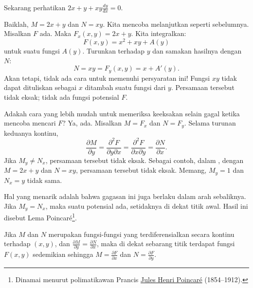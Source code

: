 \begin{example} \label{exact:example:2xyandxy}
Sekarang perhatikan $2x+y + xy \frac{dy}{dx} = 0$.

Baiklah\@, $M = 2x+y$ dan $N=xy$.  Kita mencoba melanjutkan seperti sebelumnya.
Misalkan
$F$ ada.  Maka $F_x (x,y) = 2x+y$.
Kita integralkan:
\begin{equation*}
F(x,y) = x^2 + xy + A(y)
\end{equation*}
untuk suatu fungsi $A(y)$.  Turunkan terhadap $y$ dan samakan hasilnya dengan $N$:
\begin{equation*}
N = xy = F_y (x,y) = x+A'(y) .
\end{equation*}
Akan tetapi, tidak ada cara untuk memenuhi persyaratan ini!  Fungsi $xy$ tidak dapat
dituliskan sebagai $x$ ditambah suatu fungsi dari $y$.  Persamaan tersebut tidak
eksak; tidak ada fungsi potensial $F$.
\end{example}

Adakah cara yang lebih mudah untuk memeriksa keeksakan selain gagal
ketika mencoba mencari $F$?
Ya, ada.  Misalkan
$M = F_x$ dan
$N = F_y$.
Selama turunan keduanya kontinu,
\begin{equation*}
\frac{\partial M}{\partial y}
=
\frac{\partial^2 F}{\partial y \partial x}
=
\frac{\partial^2 F}{\partial x \partial y}
=
\frac{\partial N}{\partial x} .
\end{equation*}
Jika $M_y \neq N_x$, persamaan tersebut tidak eksak.
Sebagai contoh,
dalam ,
dengan $M = 2x + y$ dan $N = xy$,
persamaan tersebut tidak eksak.
Memang,
$M_y = 1$ dan $N_x = y$ tidak sama.

Hal yang menarik adalah bahwa gagasan ini juga berlaku dalam arah sebaliknya.
Jika $M_y=N_x$, maka suatu potensial ada, setidaknya di dekat titik awal.
Hasil ini disebut Lema Poincar\'e\footnote{Dinamai menurut polimatikawan Prancis
\href{https://en.wikipedia.org/wiki/Henri_Poincar\%C3\%A9}{Jules Henri
Poincar\'e} (1854--1912).}.

\begin{theorem}
Jika $M$ dan $N$ merupakan fungsi-fungsi yang terdiferensialkan secara kontinu terhadap $(x,y)$, dan
$\frac{\partial M}{\partial y} = \frac{\partial N}{\partial x}$,
maka di dekat sebarang titik terdapat fungsi $F(x,y)$
sedemikian sehingga
$M = \frac{\partial F}{\partial x}$ dan
$N = \frac{\partial F}{\partial y}$.
\end{theorem}

